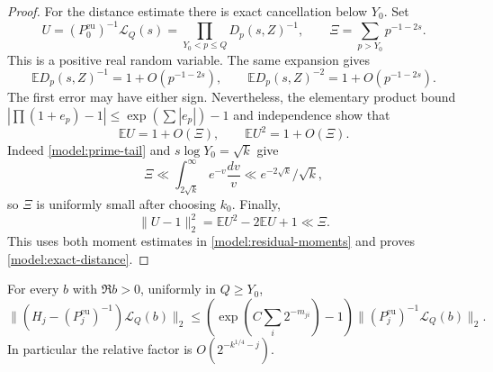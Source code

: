\begin{proof}
For the distance estimate there is exact cancellation below $Y_0$.
Set
\[
 U=(P_0^{\mathrm{eu}})^{-1}\mathcal L_Q(s)
       =\prod_{Y_0<p\le Q}D_p(s,Z)^{-1},\qquad
 \Xi=\sum_{p>Y_0}p^{-1-2s}.
\]
This is a positive real random variable.  The same expansion gives
\[
 \mathbb E D_p(s,Z)^{-1}=1+O(p^{-1-2s}),\qquad
 \mathbb E D_p(s,Z)^{-2}=1+O(p^{-1-2s}).
\]
The first error may have either sign.  Nevertheless, the elementary
product bound $|\prod(1+e_p)-1|\le\exp(\sum|e_p|)-1$ and
independence show that
\begin{equation}
 \mathbb EU=1+O(\Xi),\qquad \mathbb EU^2=1+O(\Xi).
 \label{model:residual-moments}
\end{equation}
Indeed \eqref{model:prime-tail} and $s\log Y_0=\sqrt k$ give
\[
 \Xi\ll\int_{2\sqrt k}^{\infty}e^{-v}\frac{dv}v
       \ll e^{-2\sqrt k}/\sqrt k,
\]
so $\Xi$ is uniformly small after choosing $k_0$.  Finally,
\[
 \|U-1\|_2^2=\mathbb EU^2-2\mathbb EU+1\ll\Xi.
\]
This uses both moment estimates in \eqref{model:residual-moments} and
proves \eqref{model:exact-distance}.
\end{proof}

\begin{lemma}
\label{model:relative-truncation}
For every $b$ with $\Re b>0$, uniformly in $Q\ge Y_0$,
\begin{equation}
 \|(H_j-(P_j^{\mathrm{eu}})^{-1})\mathcal L_Q(b)\|_2
 \le \left(\exp\left(C\sum_i2^{-m_{ji}}\right)-1\right)
       \|(P_j^{\mathrm{eu}})^{-1}\mathcal L_Q(b)\|_2.
 \label{model:relative-error}
\end{equation}
In particular the relative factor is
$O(2^{-k^{1/4}-j})$.
\end{lemma}

